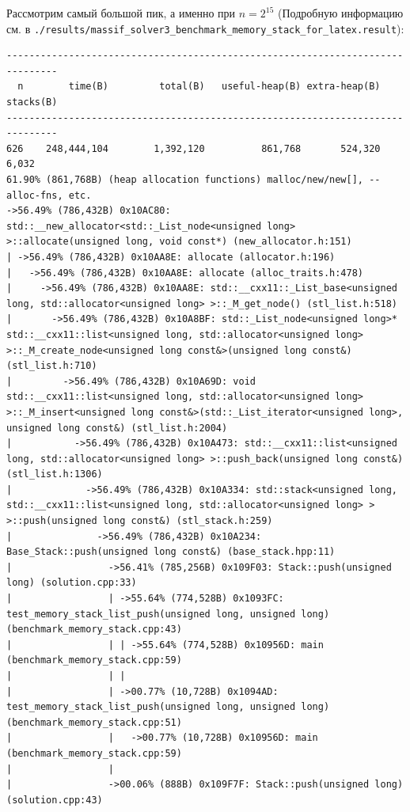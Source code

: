 Рассмотрим самый большой пик, а именно при \(n = 2^{15}\) (Подробную информацию см. в \texttt{./results/massif_solver3_\-benchmark_memory_stack_\-for_latex.result}):
\begin{lstlisting}[caption={}, label={}, style=style_code_block]
-------------------------------------------------------------------------------
  n        time(B)         total(B)   useful-heap(B) extra-heap(B)   stacks(B)
-------------------------------------------------------------------------------
626    248,444,104        1,392,120          861,768       524,320        6,032
61.90% (861,768B) (heap allocation functions) malloc/new/new[], --alloc-fns, etc.
->56.49% (786,432B) 0x10AC80: std::__new_allocator<std::_List_node<unsigned long> >::allocate(unsigned long, void const*) (new_allocator.h:151)
| ->56.49% (786,432B) 0x10AA8E: allocate (allocator.h:196)
|   ->56.49% (786,432B) 0x10AA8E: allocate (alloc_traits.h:478)
|     ->56.49% (786,432B) 0x10AA8E: std::__cxx11::_List_base<unsigned long, std::allocator<unsigned long> >::_M_get_node() (stl_list.h:518)
|       ->56.49% (786,432B) 0x10A8BF: std::_List_node<unsigned long>* std::__cxx11::list<unsigned long, std::allocator<unsigned long> >::_M_create_node<unsigned long const&>(unsigned long const&) (stl_list.h:710)
|         ->56.49% (786,432B) 0x10A69D: void std::__cxx11::list<unsigned long, std::allocator<unsigned long> >::_M_insert<unsigned long const&>(std::_List_iterator<unsigned long>, unsigned long const&) (stl_list.h:2004)
|           ->56.49% (786,432B) 0x10A473: std::__cxx11::list<unsigned long, std::allocator<unsigned long> >::push_back(unsigned long const&) (stl_list.h:1306)
|             ->56.49% (786,432B) 0x10A334: std::stack<unsigned long, std::__cxx11::list<unsigned long, std::allocator<unsigned long> > >::push(unsigned long const&) (stl_stack.h:259)
|               ->56.49% (786,432B) 0x10A234: Base_Stack::push(unsigned long const&) (base_stack.hpp:11)
|                 ->56.41% (785,256B) 0x109F03: Stack::push(unsigned long) (solution.cpp:33)
|                 | ->55.64% (774,528B) 0x1093FC: test_memory_stack_list_push(unsigned long, unsigned long) (benchmark_memory_stack.cpp:43)
|                 | | ->55.64% (774,528B) 0x10956D: main (benchmark_memory_stack.cpp:59)
|                 | |   
|                 | ->00.77% (10,728B) 0x1094AD: test_memory_stack_list_push(unsigned long, unsigned long) (benchmark_memory_stack.cpp:51)
|                 |   ->00.77% (10,728B) 0x10956D: main (benchmark_memory_stack.cpp:59)
|                 |     
|                 ->00.06% (888B) 0x109F7F: Stack::push(unsigned long) (solution.cpp:43)

\end{lstlisting}
